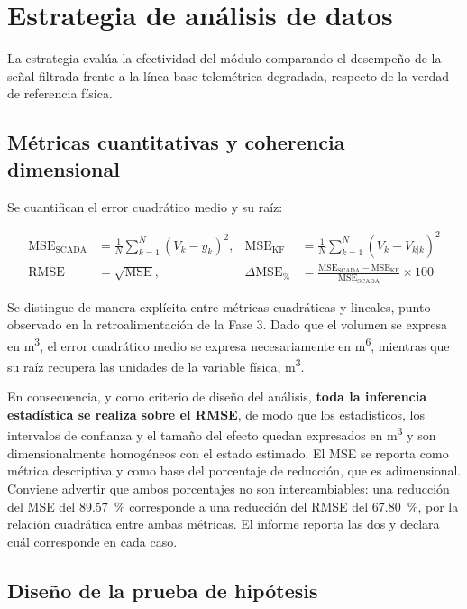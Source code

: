 \section{Estrategia de análisis de datos}
\label{sec:analisis}

La estrategia evalúa la efectividad del módulo comparando el desempeño de la
señal filtrada frente a la línea base telemétrica degradada, respecto de la
verdad de referencia física.

\subsection{Métricas cuantitativas y coherencia dimensional}

Se cuantifican el error cuadrático medio y su raíz:

\begin{align}
\mathrm{MSE}_{\text{SCADA}} &= \frac{1}{N}\sum_{k=1}^{N}\left(V_{k}-y_{k}\right)^{2},
&
\mathrm{MSE}_{\text{KF}} &= \frac{1}{N}\sum_{k=1}^{N}
\left(V_{k}-\hat{V}_{k|k}\right)^{2}
\label{eq:mse}\\[0.3em]
\mathrm{RMSE} &= \sqrt{\mathrm{MSE}},
&
\Delta\mathrm{MSE}_{\%} &= \frac{\mathrm{MSE}_{\text{SCADA}}
-\mathrm{MSE}_{\text{KF}}}{\mathrm{MSE}_{\text{SCADA}}}\times 100
\label{eq:reduccion}
\end{align}

Se distingue de manera explícita entre métricas cuadráticas y lineales, punto
observado en la retroalimentación de la Fase 3. Dado que el volumen se expresa
en \si{\metre\cubed}, el error cuadrático medio se expresa necesariamente en
\si{\metre\tothe{6}}, mientras que su raíz recupera las unidades de la variable
física, \si{\metre\cubed}.

En consecuencia, y como criterio de diseño del análisis, \textbf{toda la
inferencia estadística se realiza sobre el RMSE}, de modo que los estadísticos,
los intervalos de confianza y el tamaño del efecto quedan expresados en
\si{\metre\cubed} y son dimensionalmente homogéneos con el estado estimado. El
MSE se reporta como métrica descriptiva y como base del porcentaje de reducción,
que es adimensional. Conviene advertir que ambos porcentajes no son
intercambiables: una reducción del MSE del \SI{89,57}{\percent} corresponde a una
reducción del RMSE del \SI{67,80}{\percent}, por la relación cuadrática entre
ambas métricas. El informe reporta las dos y declara cuál corresponde en cada
caso.

\subsection{Diseño de la prueba de hipótesis}

